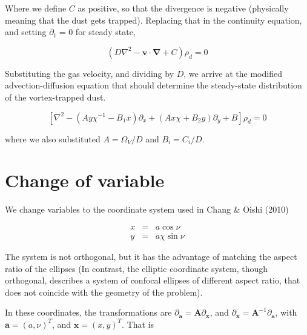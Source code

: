 \documentclass[apj]{emulateapj}
\newcommand{\pderiv}[2]{\frac{\partial #1}{\partial #2}}
\newcommand{\pderivn}[3]{\frac{\partial^{#3} #1}{\partial #2^{#3}}}
\newcommand{\vt}[1]{\mathbf{#1}}       %
\renewcommand{\v}[1]{{\boldsymbol{#1}}} %
\newcommand{\del}{\v{\nabla}}
\newcommand{\Laplace}{\nabla^2}
\newcommand{\beq}{\begin{equation}}
\newcommand{\eeq}{\end{equation}}
\newcommand{\beqn}{\begin{eqnarray}}
\newcommand{\eeqn}{\end{eqnarray}}
\begin{document}
\noindent Where we define $C$ as positive, so that the divergence is negative (physically meaning that the dust gets trapped). Replacing that in the continuity equation, and setting $\partial_t$ =
0 for steady state, 

\beq
\left(D\Laplace{} -  \v{v}\cdot\del  + C\right)\rho_d = 0 
\eeq

Substituting the gas velocity, and dividing by $D$, we
arrive at the modified advection-diffusion equation that should
determine the steady-state distribution of the vortex-trapped dust.




\beq
\left[\Laplace{} - \left(Ay\chi^{-1} - B_1x\right) \partial_x  +  \left(A x \chi + B_2y\right) \partial_y + B \right] \rho_d   = 0 
\eeq

\noindent where we also substituted  $A=\varOmega_V/D$ and $B_i=C_i/D$.

\section{Change of variable}

We change variables to the coordinate system used in Chang \& Oishi (2010)

\beqn
  x &=& a \cos\nu \\
  y &=& a\chi\sin\nu
\eeqn

The system is not orthogonal, but it has the advantage of matching the
aspect ratio of the ellipses (In contrast, the elliptic coordinate
system, though orthogonal, describes a system of confocal ellipses of
different aspect ratio, that does not coincide with the geometry of
the problem). 

In these coordinates, the transformations are $\partial_\v{a} =
\vt{A} \partial_\v{x}$, and $\partial_\v{x} =
\vt{A}^{-1} \partial_\v{a}$, with $\v{a} = (a,\nu)^T$, and $\v{x} =
(x,y)^T$. That is
\end{document}
